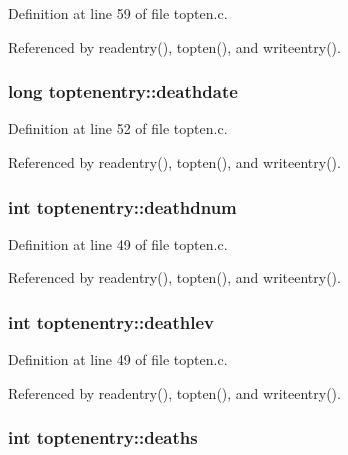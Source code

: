 Definition at line 59 of file topten.\+c.



Referenced by readentry(), topten(), and writeentry().

\hypertarget{structtoptenentry_a4f6b60626cd0c1fac745178de2c5a6c9}{
\subsubsection[{deathdate}]{\setlength{\rightskip}{0pt plus 5cm}long toptenentry\+::deathdate}}\label{structtoptenentry_a4f6b60626cd0c1fac745178de2c5a6c9}


Definition at line 52 of file topten.\+c.



Referenced by readentry(), topten(), and writeentry().

\hypertarget{structtoptenentry_a505b721116a47adbd7ccfaf8a58bad96}{
\subsubsection[{deathdnum}]{\setlength{\rightskip}{0pt plus 5cm}int toptenentry\+::deathdnum}}\label{structtoptenentry_a505b721116a47adbd7ccfaf8a58bad96}


Definition at line 49 of file topten.\+c.



Referenced by readentry(), topten(), and writeentry().

\hypertarget{structtoptenentry_a61b1f3fa6f066f1ca962c34e4c4e48af}{
\subsubsection[{deathlev}]{\setlength{\rightskip}{0pt plus 5cm}int toptenentry\+::deathlev}}\label{structtoptenentry_a61b1f3fa6f066f1ca962c34e4c4e48af}


Definition at line 49 of file topten.\+c.



Referenced by readentry(), topten(), and writeentry().

\hypertarget{structtoptenentry_a831da8fec0aa7c228c73bfdedfb4500b}{
\subsubsection[{deaths}]{\setlength{\rightskip}{0pt plus 5cm}int toptenentry\+::deaths}}\label{structtoptenentry_a831da8fec0aa7c228c73bfdedfb4500b}


